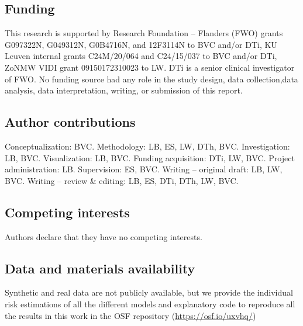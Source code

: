 \subsection*{Funding} This research is supported by Research Foundation -- Flanders (FWO) grants G097322N, G049312N, G0B4716N, and 12F3114N to BVC and/or DTi, KU Leuven internal grants C24M/20/064 and C24/15/037 to BVC and/or DTi, ZoNMW VIDI grant 09150172310023 to LW. DTi is a senior clinical investigator of FWO. No funding source had any role in the study design, data collection,data analysis, data interpretation, writing, or submission of this report.

\subsection*{Author contributions} Conceptualization: BVC. Methodology: LB, ES, LW, DTh, BVC. Investigation: LB, BVC. Visualization: LB, BVC. Funding acquisition: DTi, LW, BVC. Project administration: LB. Supervision: ES, BVC. Writing -- original draft: LB, LW, BVC. Writing -- review \& editing: LB, ES, DTi, DTh, LW, BVC.

\subsection*{Competing interests} Authors declare that they have no competing interests.

\subsection*{Data and materials availability} Synthetic and real data are not publicly available, but we provide the individual risk estimations of all the different models and explanatory code to reproduce all the results in this work in the OSF repository (\url{https://osf.io/uxvhq/})
